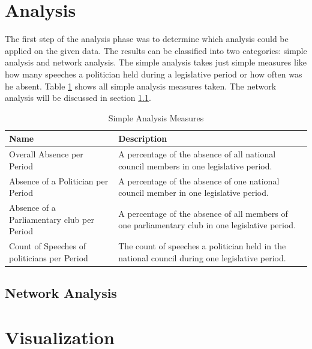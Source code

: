 \section{Analysis}
\label{sec:analysis}

The first step of the analysis phase was to determine which analysis could be applied on the given data. The results can be classified into two categories: simple analysis and network analysis. The simple analysis takes just simple measures like how many speeches a politician held during a legislative period or how often was he absent. Table \ref{table:simple_analysis} shows all simple analysis measures taken. The network analysis will be discussed in section \ref{sec:network_analysis}.

\begin{table}
\begin{tabular}{| p{5cm} | p{8cm} |}
\hline
  Name & Description \\
\hline
\hline
  Overall Absence per Period & A percentage of the absence of all national council members in one legislative period. \\
\hline
Absence of a Politician per Period & A percentage of the absence of one national council member in one legislative period. \\
\hline
Absence of a Parliamentary club per Period & A percentage of the absence of all members of one parliamentary club in one legislative period. \\
\hline
Count of Speeches of politicians per Period & The count of speeches a politician held in the national council during one legislative period. \\
\hline

\end{tabular}

\caption{Simple Analysis Measures}
\label{table:simple_analysis}
\end{table}

\subsection{Network Analysis}
\label{sec:network_analysis}

\section{Visualization}
\label{sec:visualization}
